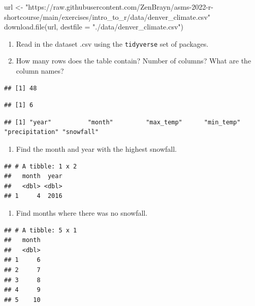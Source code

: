 \documentclass[
]{book}
\newenvironment{Shaded}{\begin{snugshade}}{\end{snugshade}}
\newcommand{\AttributeTok}[1]{\textcolor[rgb]{0.77,0.63,0.00}{#1}}
\newcommand{\FunctionTok}[1]{\textcolor[rgb]{0.00,0.00,0.00}{#1}}
\newcommand{\NormalTok}[1]{#1}
\newcommand{\OtherTok}[1]{\textcolor[rgb]{0.56,0.35,0.01}{#1}}
\newcommand{\StringTok}[1]{\textcolor[rgb]{0.31,0.60,0.02}{#1}}
\providecommand{\tightlist}{%
  \setlength{\itemsep}{0pt}\setlength{\parskip}{0pt}}
\begin{document}
\begin{Shaded}
\begin{Highlighting}[]
\NormalTok{url }\OtherTok{\textless{}{-}} \StringTok{"https://raw.githubusercontent.com/ZenBrayn/asms{-}2022{-}r{-}shortcourse/main/exercises/intro\_to\_r/data/denver\_climate.csv"}
\FunctionTok{download.file}\NormalTok{(url, }\AttributeTok{destfile =} \StringTok{"./data/denver\_climate.csv"}\NormalTok{)}
\end{Highlighting}
\end{Shaded}

\begin{enumerate}
\def\labelenumi{\arabic{enumi}.}
\setcounter{enumi}{1}
\item
  Read in the dataset .csv using the \texttt{tidyverse} set of packages.
\item
  How many rows does the table contain? Number of columns? What are the column names?
\end{enumerate}

\begin{verbatim}
## [1] 48
\end{verbatim}

\begin{verbatim}
## [1] 6
\end{verbatim}

\begin{verbatim}
## [1] "year"          "month"         "max_temp"      "min_temp"      "precipitation" "snowfall"
\end{verbatim}

\begin{enumerate}
\def\labelenumi{\arabic{enumi}.}
\setcounter{enumi}{3}
\tightlist
\item
  Find the month and year with the highest snowfall.
\end{enumerate}

\begin{verbatim}
## # A tibble: 1 x 2
##   month  year
##   <dbl> <dbl>
## 1     4  2016
\end{verbatim}

\begin{enumerate}
\def\labelenumi{\arabic{enumi}.}
\setcounter{enumi}{4}
\tightlist
\item
  Find months where there was no snowfall.
\end{enumerate}

\begin{verbatim}
## # A tibble: 5 x 1
##   month
##   <dbl>
## 1     6
## 2     7
## 3     8
## 4     9
## 5    10
\end{verbatim}
\end{document}
